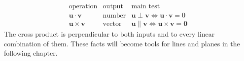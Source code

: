 \begin{summarybox}
\[
\begin{array}{c|c|c}
\text{operation}&\text{output}&\text{main test}\\
\hline
\mathbf u\cdot\mathbf v&\text{number}&
\mathbf u\perp\mathbf v\iff\mathbf u\cdot\mathbf v=0\\
\mathbf u\times\mathbf v&\text{vector}&
\mathbf u\parallel\mathbf v\iff\mathbf u\times\mathbf v=\mathbf0
\end{array}
\]
The cross product is perpendicular to both inputs and to every linear
combination of them. These facts will become tools for lines and planes in the
following chapter.
\end{summarybox}
